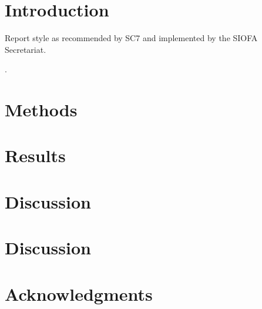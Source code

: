 \section{Introduction}

Report style as recommended by SC7 \citep{SC7} and implemented by the SIOFA Secretariat.

\citep{MoP1}.


\section{Methods}

\section{Results}

\section{Discussion}

\section{Discussion}

\section{Acknowledgments}

 